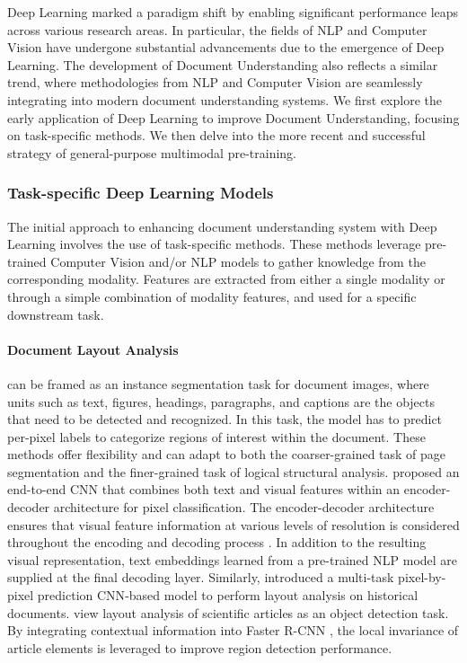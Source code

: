Deep Learning marked a paradigm shift by enabling significant performance leaps across various research areas. In particular, the fields of \ac{NLP} and Computer Vision have undergone substantial advancements due to the emergence of Deep Learning. The development of Document Understanding also reflects a similar trend, where methodologies from \ac{NLP} and Computer Vision are seamlessly integrating into modern document understanding systems. We first explore the early application of Deep Learning to improve Document Understanding, focusing on task-specific methods. We then delve into the more recent and successful strategy of general-purpose multimodal pre-training.


\subsubsection{Task-specific Deep Learning Models}

The initial approach to enhancing document understanding system with Deep Learning involves the use of task-specific methods. These methods leverage pre-trained Computer Vision and/or \ac{NLP} models to gather knowledge from the corresponding modality. Features are extracted from either a single modality or through a simple combination of modality features, and used for a specific downstream task. 


\paragraph{Document Layout Analysis} can be framed as an instance segmentation task for document images, where units such as text, figures, headings, paragraphs,
and captions are the objects that need to be detected and recognized. In this task, the model has to predict per-pixel labels to categorize regions of interest within the document. These methods offer flexibility and can adapt to both the coarser-grained task of page segmentation and the finer-grained task of logical structural analysis. \citet{yang2017learning} proposed an end-to-end \ac{CNN} that combines both text and visual features within an encoder-decoder architecture for pixel classification. The encoder-decoder architecture ensures that visual feature information at various levels of resolution is considered throughout the encoding and decoding process \citep{burt1987laplacian}. In addition to the resulting visual representation, text embeddings learned from a pre-trained \ac{NLP} model are supplied at the final decoding layer. Similarly, \citet{oliveira2018dhsegment} introduced a multi-task pixel-by-pixel prediction \ac{CNN}-based model to perform layout analysis on historical documents. \citet{soto2019visual} view layout analysis of scientific articles as an object detection task. By integrating contextual information into Faster R-CNN \citep{ren2015faster}, the local invariance of article elements is leveraged to improve region detection performance. 

